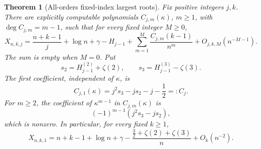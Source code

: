 \documentclass[11pt]{article}
\numberwithin{equation}{section}
\newtheorem{theorem}{Theorem}[section]
\theoremstyle{definition}
\theoremstyle{remark}
\begin{document}
\begin{theorem}[All-orders fixed-index largest roots]
\label{thm:cohen-extreme-roots}
Fix positive integers $j,k$.  There are explicitly computable
polynomials $C_{j,m}(\kappa)$, $m\geq1$, with
$\deg C_{j,m}=m-1$, such that for every fixed integer $M\geq0$,
\begin{equation}\label{eq:cohen-extreme-root-all-orders}
 X_{n,k,j}=\frac{n+k-1}{j}+\log n+\gamma-H_{j-1}
     +\sum_{m=1}^{M}\frac{C_{j,m}(k-1)}{n^m}
     +O_{j,k,M}(n^{-M-1}).
\end{equation}
The sum is empty when $M=0$.  Put
\[
 s_2=H_{j-1}^{(2)}+\zeta(2),\qquad
 s_3=H_{j-1}^{(3)}-\zeta(3).
\]
The first coefficient, independent of $\kappa$, is
\begin{equation}\label{eq:cohen-Cj}
 C_{j,1}(\kappa)=j^2s_3-js_2-j-\frac12=:C_j.
\end{equation}
For $m\geq2$, the coefficient of $\kappa^{m-1}$ in
$C_{j,m}(\kappa)$ is
\begin{equation}\label{eq:cohen-leading-parameter-coefficient}
 (-1)^{m-1}(j^2s_3-js_2),
\end{equation}
which is nonzero.  In particular, for every fixed $k\geq1$,
\begin{equation}\label{eq:cohen-largest-root}
 X_{n,k,1}=n+k-1+\log n+\gamma
     -\frac{\frac32+\zeta(2)+\zeta(3)}{n}+O_k(n^{-2}).
\end{equation}
\end{theorem}
\end{document}
